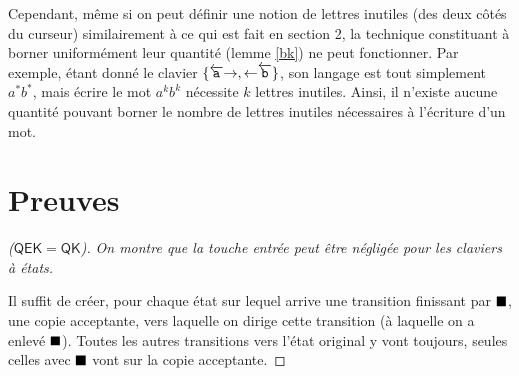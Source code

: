 \documentclass[12pt, a4paper]{article}
\begin{document}
    Cependant, même si on peut définir une notion de lettres inutiles (des deux côtés du curseur) similairement à ce qui est fait en section 2, la technique constituant à borner uniformément leur quantité (lemme \ref{bk}) ne peut fonctionner.
    Par exemple, étant donné le clavier $\{\overleftarrow{\mathtt{a}}\mathord{\rightarrow},\mathord{\leftarrow}\overleftarrow{\mathtt{b}}\}$, son langage est tout simplement $a^*b^*$, mais écrire le mot $a^kb^k$ nécessite $k$ lettres inutiles. Ainsi, il n'existe aucune quantité pouvant borner le nombre de lettres inutiles nécessaires à l'écriture d'un mot.
    
    \clearpage
    \appendix
    \section{Preuves}
    \begin{proof}[($\mathsf{QEK} = \mathsf{QK}$)]
        \emph{On montre que la touche entrée peut être négligée pour les claviers à états.} 

        Il suffit de créer, pour chaque état sur lequel arrive une transition finissant par $\mathord{\blacksquare}$, une copie acceptante, vers laquelle on dirige cette transition (à laquelle on a enlevé $\mathord{\blacksquare}$).
        Toutes les autres transitions vers l'état original y vont toujours, seules celles avec $\mathord{\blacksquare}$ vont sur la copie acceptante. \medskip

    \end{proof}
\end{document}
